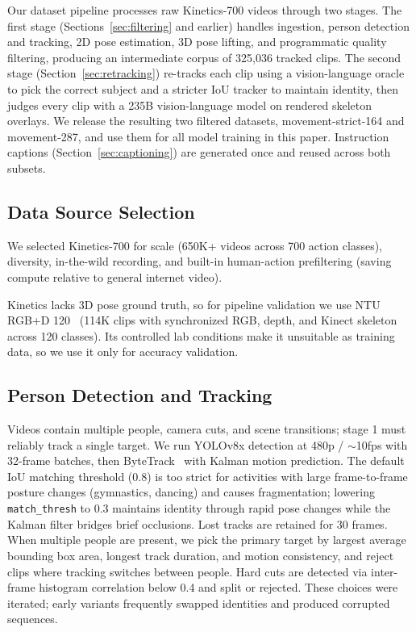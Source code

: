 \documentclass[letterpaper, 10pt, conference]{ieeeconf}
\begin{document}
Our dataset pipeline processes raw Kinetics-700 videos through two stages. The first stage (Sections~\ref{sec:filtering} and earlier) handles ingestion, person detection and tracking, 2D pose estimation, 3D pose lifting, and programmatic quality filtering, producing an intermediate corpus of 325,036 tracked clips. The second stage (Section~\ref{sec:retracking}) re-tracks each clip using a vision-language oracle to pick the correct subject and a stricter IoU tracker to maintain identity, then judges every clip with a 235B vision-language model on rendered skeleton overlays. We release the resulting two filtered datasets, movement-strict-164 and movement-287, and use them for all model training in this paper. Instruction captions (Section~\ref{sec:captioning}) are generated once and reused across both subsets.

\subsection{Data Source Selection}

We selected Kinetics-700 for scale (650K+ videos across 700 action classes), diversity, in-the-wild recording, and built-in human-action prefiltering (saving compute relative to general internet video).

Kinetics lacks 3D pose ground truth, so for pipeline validation we use NTU RGB+D 120~\cite{ntu120} (114K clips with synchronized RGB, depth, and Kinect skeleton across 120 classes). Its controlled lab conditions make it unsuitable as training data, so we use it only for accuracy validation.

\subsection{Person Detection and Tracking}

Videos contain multiple people, camera cuts, and scene transitions; stage 1 must reliably track a single target. We run YOLOv8x detection at 480p / $\sim$10fps with 32-frame batches, then ByteTrack~\cite{bytetrack} with Kalman motion prediction. The default IoU matching threshold ($0.8$) is too strict for activities with large frame-to-frame posture changes (gymnastics, dancing) and causes fragmentation; lowering \texttt{match\_thresh} to $0.3$ maintains identity through rapid pose changes while the Kalman filter bridges brief occlusions. Lost tracks are retained for 30 frames. When multiple people are present, we pick the primary target by largest average bounding box area, longest track duration, and motion consistency, and reject clips where tracking switches between people. Hard cuts are detected via inter-frame histogram correlation below 0.4 and split or rejected. These choices were iterated; early variants frequently swapped identities and produced corrupted sequences.
\end{document}
